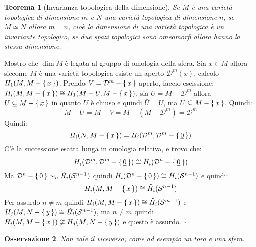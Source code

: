 \documentclass[10pt, twoside=false, x11names]{scrbook}
\newtheorem{theorem}{Teorema}[section]
\newtheorem{osservation}[theorem]{Osservazione}
\newenvironment{proof}{{\textbf{Dimostrazione}:}}{\hfill $\square$}
\newcommand{\me}{\mathrm{e}}
\newcommand{\Sph}[1][]{\mathcal{S}^#1}
\newcommand{\Disk}[1][]{\mathcal{D}^#1}
\renewcommand{\vec}[1]{\underline{#1}}
\let\setminus-
\begin{document}
\begin{theorem}[Invarianza topologica della dimensione]
  Se $ M $ è una varietà topologica di dimensione $ m $ e $ N $ una varietà
  topologica di dimensione $ n $, se $ M \simeq N $ allora $ m = n $, cioè la dimensione
  di una varietà topologica è un invariante topologico, se due spazi topologici sono
  omeomorfi allora hanno la stessa dimensione.
\end{theorem}
\begin{proof}
  Mostro che $ \dim{M} $ è legata al gruppo di omologia della sfera.
  Sia $ x \in M $ allora siccome $ M $ è una varietà topologica esiste un aperto
  $ \Disk{m}(x) $, calcolo $ H_1(M, M \setminus \set{x}) $.
  Prendo $ V = \Disk{m} \setminus \set{x} $ aperto, faccio escissione:
  $ H_i(M, M \setminus \set{x}) \cong H_1(M \setminus U, M \setminus \set{x}) $, sia $ U = M \setminus \Disk{m} $
  allora $ \bar{U} \subseteq M \setminus \set{x} $ in quanto $ U $ è chiuso e quindi
  $ \bar{U} = U $, ma $ U \subseteq M \setminus \set{x} $.
  Quindi:
  \[
    M \setminus U = M \setminus V = M \setminus (M \setminus \Disk{m}) = \Disk{m}
  \]
  Quindi:
  \[
    H_i(N, M \setminus \set{x}) = H_i(\Disk{m}, \Disk{m} \setminus \set{\vec{0}})
  \]
  C'è la successione esatta lunga in omologia relativa, e trovo che:
  \[
    H_i(\Disk{m}, \Disk{m} \setminus \set{\vec{0}}) \cong \tilde{H}_i(\Disk{n} \setminus \set{\vec{0}})
  \]
  Ma $ \Disk{n} \setminus \set{\vec{0}} \sim_h \tilde{H}_i(\Sph{n-1}) $ quindi
  $ \tilde{H}_i(\Disk{n} \setminus \set{\vec{0}}) \cong \tilde{H}_i(\Sph{n-1}) $
  e quindi:
  \[
    H_i(M, M \setminus \set{x}) \cong \tilde{H}_i(\Sph{n-1})
  \]
  Per assurdo $ n \not = m $ quindi $ H_i(M, M \setminus \set{x}) \cong \tilde{H}_i(\Sph{m-1}) $
  e $ H_j(M, N \setminus \set{y}) \cong \tilde{H}_i(\Sph{n-1}) $, ma $ n \not = m $ quindi
  $ H_i(M, M \setminus \set{x}) \not \cong H_j(M, N \setminus \set{y}) $ e questo è assurdo.
\end{proof}
\begin{osservation}
  Non vale il viceversa, come ad esempio un toro e una sfera.
\end{osservation}

\printindex
\end{document}
